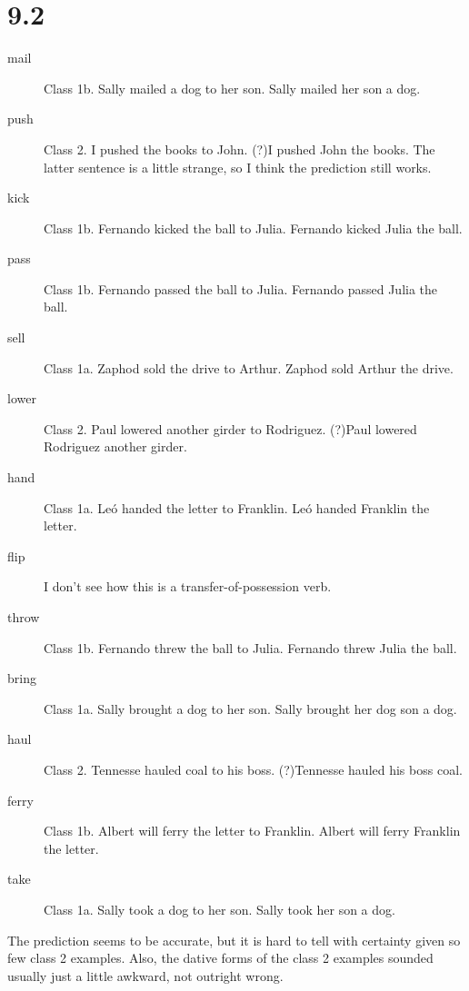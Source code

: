 \documentclass[12pt]{article}
\begin{document}
\section*{9.2}
\begin{description}
\item[mail] Class 1b.  Sally mailed a dog to her son.  Sally mailed her
son a dog.
\item[push] Class 2.  I pushed the books to John.  (?)I pushed John the
books.  The latter sentence is a little strange, so I think the
prediction still works.
\item[kick] Class 1b.  Fernando kicked the ball to Julia.  Fernando
kicked Julia the ball.
\item[pass] Class 1b.  Fernando passed the ball to Julia.  Fernando
passed Julia the ball.
\item[sell] Class 1a.  Zaphod sold the drive to Arthur.  Zaphod sold
Arthur the drive.
\item[lower] Class 2.  Paul lowered another girder to Rodriguez.  (?)Paul
lowered Rodriguez another girder.
\item[hand] Class 1a.  Le\'o handed the letter to Franklin.  Le\'o
handed Franklin the letter.
\item[flip] I don't see how this is a transfer-of-possession verb.
\item[throw] Class 1b.  Fernando threw the ball to Julia.  Fernando
threw Julia the ball.
\item[bring] Class 1a.  Sally brought a dog to her son.  Sally brought
her dog son a dog.
\item[haul] Class 2.  Tennesse hauled coal to his boss.  (?)Tennesse hauled
his boss coal.
\item[ferry] Class 1b.  Albert will ferry the letter to Franklin.
Albert will ferry Franklin the letter.
\item[take] Class 1a.  Sally took a dog to her son.  Sally took her son
a dog.
\end{description}

The prediction seems to be accurate, but it is hard to tell with
certainty given so few class 2 examples.  Also, the dative forms of the
class 2 examples sounded usually just a little awkward, not outright
wrong.
\end{document}

